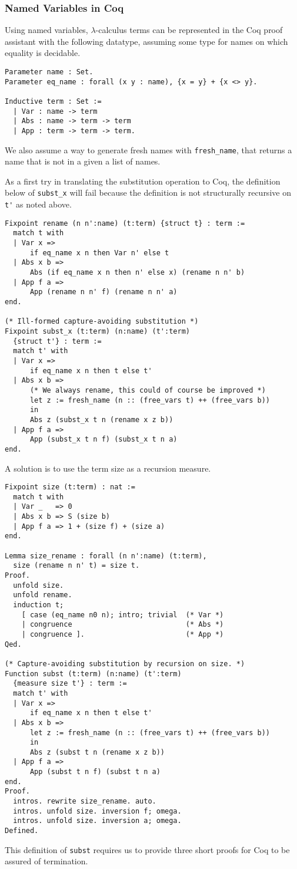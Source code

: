 \documentclass[a4paper,11pt]{article}
\begin{document}
\subsubsection*{Named Variables in Coq}

Using named variables, $\lambda$-calculus terms can be represented in the
Coq proof assistant with the following datatype, assuming some type for
names on which equality is decidable.
\begin{lstlisting}
Parameter name : Set.
Parameter eq_name : forall (x y : name), {x = y} + {x <> y}.

Inductive term : Set :=
  | Var : name -> term
  | Abs : name -> term -> term
  | App : term -> term -> term.
\end{lstlisting}
We also assume a way to generate fresh names with \lstinline{fresh_name},
that returns a name that is not in a given a list of names.

As a first try in translating the substitution operation to Coq, the
definition below of \lstinline{subst_x} will fail because the definition
is not structurally recursive on \lstinline{t'} as noted above.
\begin{lstlisting}
Fixpoint rename (n n':name) (t:term) {struct t} : term :=
  match t with
  | Var x =>
      if eq_name x n then Var n' else t
  | Abs x b =>
      Abs (if eq_name x n then n' else x) (rename n n' b)
  | App f a =>
      App (rename n n' f) (rename n n' a)
end.

(* Ill-formed capture-avoiding substitution *)
Fixpoint subst_x (t:term) (n:name) (t':term)
  {struct t'} : term :=
  match t' with
  | Var x =>
      if eq_name x n then t else t'
  | Abs x b =>
      (* We always rename, this could of course be improved *)
      let z := fresh_name (n :: (free_vars t) ++ (free_vars b))
      in
      Abs z (subst_x t n (rename x z b))
  | App f a =>
      App (subst_x t n f) (subst_x t n a)
end.
\end{lstlisting}
A solution is to use the term size as a recursion measure.
\begin{lstlisting}
Fixpoint size (t:term) : nat :=
  match t with
  | Var _   => 0
  | Abs x b => S (size b)
  | App f a => 1 + (size f) + (size a)
end.

Lemma size_rename : forall (n n':name) (t:term),
  size (rename n n' t) = size t.
Proof.
  unfold size.
  unfold rename.
  induction t;
    [ case (eq_name n0 n); intro; trivial  (* Var *)
    | congruence                           (* Abs *)
    | congruence ].                        (* App *)
Qed.

(* Capture-avoiding substitution by recursion on size. *)
Function subst (t:term) (n:name) (t':term)
  {measure size t'} : term :=
  match t' with
  | Var x =>
      if eq_name x n then t else t'
  | Abs x b =>
      let z := fresh_name (n :: (free_vars t) ++ (free_vars b))
      in
      Abs z (subst t n (rename x z b))
  | App f a =>
      App (subst t n f) (subst t n a)
end.
Proof.
  intros. rewrite size_rename. auto.
  intros. unfold size. inversion f; omega.
  intros. unfold size. inversion a; omega.
Defined.
\end{lstlisting}
This definition of \lstinline{subst} requires us to provide three short
proofs for Coq to be assured of termination.
\end{document}
